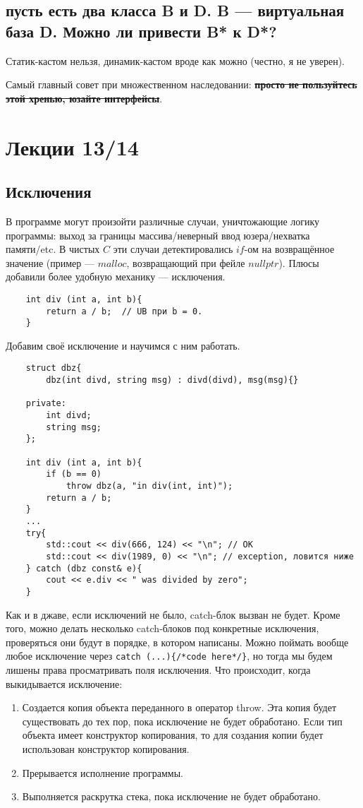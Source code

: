 \documentclass[15pt, a4paper]{article}
\newcommand{\nl}{\newline}
\begin{document}
\subsection{пусть есть два класса B и D. B — виртуальная база D. Можно ли привести B* к D*?}
Статик-кастом нельзя, динамик-кастом вроде как можно (честно, я не уверен). \nl

Самый главный совет при множественном наследовании: \textbf{\sout{просто не пользуйтесь этой хренью, юзайте интерфейсы}}. \newpage

\section{Лекции 13/14}
\subsection{Исключения}
В программе могут произойти различные случаи, уничтожающие логику программы: выход за границы массива/неверный ввод юзера/нехватка памяти/etc.
В чистых $C$ эти случаи детектировались $if$-ом на возвращённое значение (пример --- $malloc$, возвращающий при фейле $nullptr$). Плюсы добавили более удобную механику --- исключения.
\begin{verbatim}
    int div (int a, int b){
        return a / b;  // UB при b = 0.
    }
\end{verbatim}
Добавим своё исключение и научимся с ним работать.
\begin{verbatim}
    struct dbz{
        dbz(int divd, string msg) : divd(divd), msg(msg){}
    
    private:
        int divd;
        string msg;
    };

    int div (int a, int b){
        if (b == 0)
            throw dbz(a, "in div(int, int)");
        return a / b;
    }
    ...
    try{
        std::cout << div(666, 124) << "\n"; // OK
        std::cout << div(1989, 0) << "\n"; // exception, ловится ниже
    } catch (dbz const& e){
        cout << e.div << " was divided by zero";
    }
\end{verbatim}
Как и в джаве, если исключений не было, catch-блок вызван не будет. Кроме того, можно делать несколько catch-блоков под конкретные исключения, проверяться они будут в порядке, в котором написаны.
Можно поймать вообще любое исключение через \texttt{catch (...)\{/*code here*/\}}, но тогда мы будем лишены права просматривать поля исключения.
Что происходит, когда выкидывается исключение:
\begin{enumerate}
    \item Создается копия объекта переданного в оператор throw. Эта копия будет существовать до тех пор, пока исключение не будет обработано. Если тип объекта имеет конструктор копирования, то для создания копии будет использован конструктор копирования.
    \item Прерывается исполнение программы.
    \item Выполняется раскрутка стека, пока исключение не будет обработано.
\end{enumerate}
\end{document}
